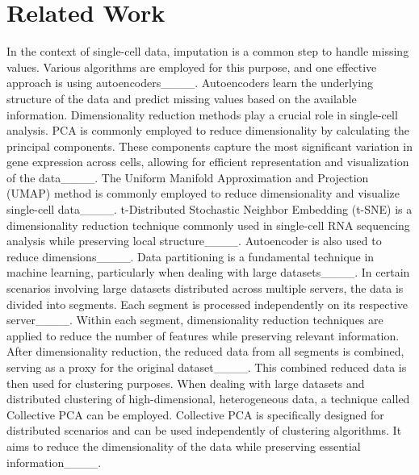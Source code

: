 \section{Related Work}
In the context of single-cell data, imputation is a common step to handle missing values. Various algorithms are employed for this purpose, and one effective approach is using autoencoders____. Autoencoders learn the underlying structure of the data and predict missing values based on the available information.  Dimensionality reduction methods play a crucial role in single-cell analysis. PCA is commonly employed to reduce dimensionality by calculating the principal components. These components capture the most significant variation in gene expression across cells, allowing for efficient representation and visualization of the data____. The Uniform Manifold Approximation and Projection (UMAP) method is commonly employed to reduce dimensionality and visualize single-cell data____. t-Distributed Stochastic Neighbor Embedding (t-SNE) is a dimensionality reduction technique commonly used in single-cell RNA sequencing analysis while preserving local structure____. Autoencoder is also used to reduce dimensions____. Data partitioning is a fundamental technique in machine learning, particularly when dealing with large datasets____. In certain scenarios involving large datasets distributed across multiple servers, the data is divided into segments. Each segment is processed independently on its respective server____. Within each segment, dimensionality reduction techniques are applied to reduce the number of features while preserving relevant information. After dimensionality reduction, the reduced data from all segments is combined, serving as a proxy for the original dataset____. This combined reduced data is then used for clustering purposes. When dealing with large datasets and distributed clustering of high-dimensional, heterogeneous data, a technique called Collective PCA can be employed. Collective PCA is specifically designed for distributed scenarios and can be used independently of clustering algorithms. It aims to reduce the dimensionality of the data while preserving essential information____.
